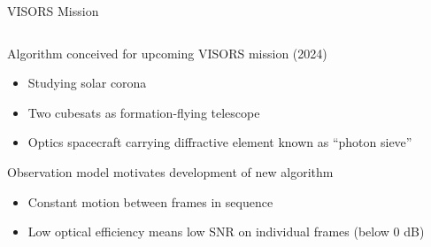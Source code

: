 \documentclass[10pt,xcolor=dvipsnames]{beamer}
\begin{document}
\begin{frame}{VISORS Mission}
  \begin{columns}
    \begin{column}{0.5 \textwidth}
      Algorithm conceived for upcoming VISORS mission (2024)
      \begin{itemize}
        \item Studying solar corona
        \item Two cubesats as formation-flying telescope
        \item Optics spacecraft carrying diffractive element known as ``photon sieve''
      \end{itemize}
      Observation model motivates development of new algorithm
      \begin{itemize}
        \item Constant motion between frames in sequence
        \item Low optical efficiency means low SNR on individual frames (below 0 dB)
      \end{itemize}
    \end{column}


\end{columns}
\end{frame}
\end{document}

